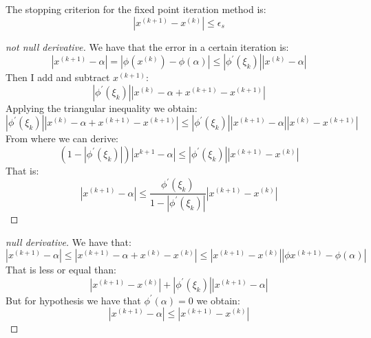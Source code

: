 \documentclass[12pt, a4paper]{report}
\begin{document}
    The stopping criterion for the fixed point iteration method is: 
    \[\left\lvert x^{(k+1)}-x^{(k)} \right\rvert \leq \epsilon_s\]
    \begin{proof}[not null derivative]
        We have that the error in a certain iteration is: 
        \[\left\lvert x^{(k+1)} - \alpha \right\rvert = \left\lvert \phi(x^{(k)}) - \phi(\alpha) \right\rvert \leq \left\lvert \phi^{'}(\xi_k)\right\rvert \left\lvert x^{(k)} - \alpha\right\rvert \]
        Then I add and subtract $x^{(k+1)}$: 
        \[\left\lvert \phi^{'}(\xi_k)\right\rvert \left\lvert x^{(k)} - \alpha + x^{(k+1)} - x^{(k+1)}\right\rvert\]
        Applying the triangular inequality we obtain: 
        \[\left\lvert \phi^{'}(\xi_k)\right\rvert 
        \left\lvert x^{(k)} - \alpha + x^{(k+1)} - x^{(k+1)}\right\rvert \leq 
        \left\lvert \phi^{'}(\xi_k)\right\rvert 
        \left\lvert x^{(k+1)} - \alpha \right\rvert 
        \left\lvert x^{(k)} - x^{(k+1)} \right\rvert\]
        From where we can derive: 
        \[\left( 1-\left\lvert \phi^{'}(\xi_k)\right\rvert \right) \left\lvert x^{k+1}-\alpha \right\rvert \leq \left\lvert \phi^{'}(\xi_k)\right\rvert \left\lvert x^{(k+1)} - x^{(k)} \right\rvert\]
        That is: 
        \[ \left\lvert x^{(k+1)} - \alpha \right\rvert \leq \dfrac{\phi^{'}(\xi_k)}{1-\left\lvert \phi^{'}(\xi_k)\right\rvert} \left\lvert x^{(k+1)} - x^{(k)} \right\rvert\]
    \end{proof}
    \begin{proof}[null derivative]
        We have that: 
        \[\left\lvert x^{(k+1)} - \alpha \right\rvert \leq \left\lvert x^{(k+1)} - \alpha + x^{(k)} - x^{(k)}\right\rvert \leq \left\lvert x^{(k+1)}-x^{(k)}\right\rvert \left\lvert \phi{x^{(k+1)}}-\phi(\alpha)\right\rvert\]
        That is less or equal than:
        \[ \left\lvert x^{(k+1)} - x^{(k)} \right\rvert 
        + 
        \left\lvert \phi^{'}(\xi_k) \right\rvert  
        \left\lvert x^{(k+1)} - \alpha \right\rvert\]
        But for hypothesis we have that $\phi^{'}(\alpha)=0$ we obtain: 
        \[ \left\lvert x^{(k+1)} - \alpha \right\rvert \leq \left\lvert x^{(k+1)} - x^{(k)} \right\rvert\]
    \end{proof}
\end{document}
